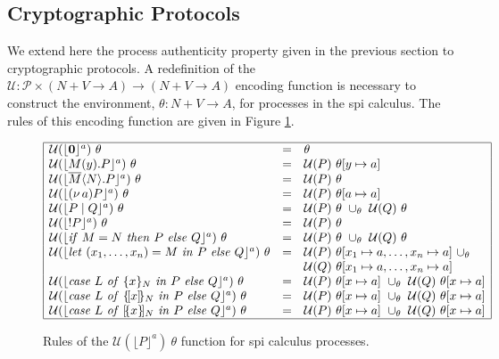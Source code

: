\documentclass[10pt,a4paper,final,oneside,fleqn]{book}
\begin{document}
\subsection{Cryptographic Protocols}
We extend here the process authenticity property given in the previous section to cryptographic protocols.  A redefinition of the $\mathcal{U}:\mathcal{P}\times(N+V\to A)\to(N+V\to A)$ encoding function is necessary to construct the environment, $\theta:N+V\to A$, for processes in the spi calculus. The rules of this encoding function are given in Figure \ref{theta2}.
\begin{figure}[bht]
\begin{small}
\begin{center}
$\begin{array}{|lll|}
\hline
\mathcal{U}(\lfloor {\bf 0}\rfloor^a)~\theta&=&\theta\\
\mathcal{U}(\lfloor M(y).P\rfloor^a)~\theta&=&\mathcal{U}(P)~\theta[y\mapsto a]\\
\mathcal{U}(\lfloor \overline{M}\langle N\rangle.P\rfloor^a)~\theta&=&\mathcal{U}(P)~\theta\\
\mathcal{U}(\lfloor (\nu~\!a)P\rfloor^a)~\theta&=&\mathcal{U}(P)~\theta[a\mapsto a]\\
\mathcal{U}(\lfloor P\mid Q\rfloor^a)~\theta&=&\mathcal{U}(P)~\theta~\cup_\theta~\mathcal{U}(Q)~\theta\\
\mathcal{U}(\lfloor !P\rfloor^a)~\theta&=&\mathcal{U}(P)~\theta\\
\mathcal{U}(\lfloor \mbox{{\itshape if\/} }M=N\mbox{ {\itshape then\/} }P\mbox{ {\itshape else\/} }Q\rfloor^a)~\theta&=&\mathcal{U}(P)~\theta~\cup_\theta~\mathcal{U}(Q)~\theta\\
\mathcal{U}(\lfloor \mbox{{\itshape let\/} }(x_1,\ldots,x_n)=M\mbox{ {\itshape in\/} }P\mbox{ {\itshape else\/} }Q\rfloor^a)~\theta&=&\mathcal{U}(P)~\theta[x_1\mapsto a,\ldots,x_n\mapsto a]~ \cup_\theta\\
&&\mathcal{U}(Q)~\theta[x_1\mapsto a,\ldots,x_n\mapsto a]\\
\mathcal{U}(\lfloor \mbox{{\itshape case\/} }L\mbox{ {\itshape of\/} }\{x\}_N\mbox{ {\itshape in\/} }P\mbox{ {\itshape else\/} }Q\rfloor^a)~\theta&=&\mathcal{U}(P)~\theta[x\mapsto a]~\cup_\theta~\mathcal{U}(Q)~\theta[x\mapsto a]\\
\mathcal{U}(\lfloor \mbox{{\itshape case\/} }L\mbox{ {\itshape of\/} }\{\![x]\!\}_N\mbox{ {\itshape in\/} }P\mbox{ {\itshape else\/} }Q\rfloor^a)~\theta&=&\mathcal{U}(P)~\theta[x\mapsto a]~\cup_\theta~\mathcal{U}(Q)~\theta[x\mapsto a]\\
\mathcal{U}(\lfloor \mbox{{\itshape case\/} }L\mbox{ {\itshape of\/} }[\!\{x\}\!]_N\mbox{ {\itshape in\/} }P\mbox{ {\itshape else\/} }Q\rfloor^a)~\theta&=&\mathcal{U}(P)~\theta[x\mapsto a]~\cup_\theta~\mathcal{U}(Q)~\theta[x\mapsto a]\\
\hline
\end{array}$
\end{center}
\end{small}
\caption{Rules of the $\mathcal{U}(\lfloor P\rfloor^a)~\theta$ function for spi calculus processes.\label{theta2}}
\end{figure}
\end{document}
